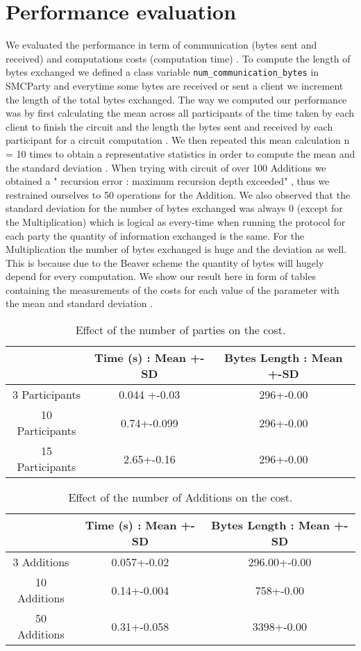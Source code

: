 \documentclass[10pt,conference,compsocconf]{IEEEtran}
\begin{document}
\section{Performance evaluation}
We evaluated the performance in term of communication (bytes sent and received) and computations costs (computation time) . To compute the length of bytes exchanged we defined a class variable \texttt{num\_communication\_bytes}  in SMCParty and everytime some bytes are received or sent a client we increment the length of the total bytes exchanged. The way we computed our performance was by first calculating the mean across all participants of the time taken by each client to finish the circuit and the length the bytes sent and received by each participant for a circuit computation . We then repeated this mean calculation n = 10 times to obtain a representative statistics in order to compute the mean and the standard deviation . When trying with circuit of over 100 Additions  we obtained a " recursion error : maximum recursion depth exceeded" , thus we restrained ourselves to 50 operations for the Addition. We also observed that the standard deviation for the number of bytes exchanged was always 0 (except for the Multiplication) which is logical as every-time when running the protocol for each party the quantity of information exchanged is the same. For the Multiplication the number of bytes exchanged is huge and the deviation as well. This is because due to the Beaver scheme the quantity of bytes will hugely depend for every computation. 
We show our result here in form of tables containing the measurements of the costs for each value of the parameter with the mean and standard deviation . 

\begin{table}[h!]
\centering
\begin{tabular}{||c c c ||} 
 \hline
  & Time (s) : Mean +-SD & Bytes Length : Mean +-SD  \\ [0.5ex] 
 \hline\hline
 3 Participants & 0.044 +-0.03 & 296+-0.00 \\ 
 10 Participants & 0.74+-0.099 & 296+-0.00  \\
 15 Participants & 2.65+-0.16 & 296+-0.00  \\ [1ex] 
 \hline
\end{tabular}
\caption{Effect of the number of parties on the cost.}
\label{table:1}
\end{table}

\begin{table}[h!]
\centering
\begin{tabular}{||c c c ||} 
 \hline
  & Time (s) : Mean +-SD & Bytes Length : Mean +-SD  \\ [0.5ex] 
 \hline\hline
 3 Additions & 0.057+-0.02 & 296.00+-0.00 \\ 
 10 Additions & 0.14+-0.004 & 758+-0.00  \\
 50 Additions & 0.31+-0.058 & 3398+-0.00  \\ [1ex] 
 \hline
\end{tabular}
\caption{Effect of the number of Additions on the cost.}
\label{table:3}
\end{table}
\end{document}
